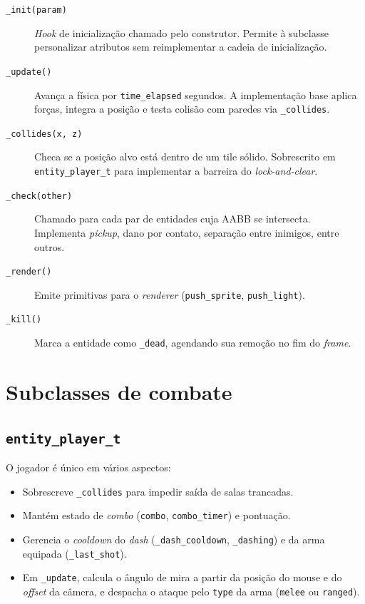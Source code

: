 \begin{description}
  \item[\texttt{\_init(param)}] \emph{Hook} de inicialização chamado pelo construtor.
    Permite à subclasse personalizar atributos sem reimplementar a cadeia de
    inicialização.
  \item[\texttt{\_update()}] Avança a física por \texttt{time\_elapsed} segundos. A
    implementação base aplica forças, integra a posição e testa colisão com paredes via
    \texttt{\_collides}.
  \item[\texttt{\_collides(x, z)}] Checa se a posição alvo está dentro de um tile
    sólido. Sobrescrito em \texttt{entity\_player\_t} para implementar a barreira do
    \emph{lock-and-clear}.
  \item[\texttt{\_check(other)}] Chamado para cada par de entidades cuja AABB se
    intersecta. Implementa \emph{pickup}, dano por contato, separação entre inimigos,
    entre outros.
  \item[\texttt{\_render()}] Emite primitivas para o \emph{renderer}
    (\texttt{push\_sprite}, \texttt{push\_light}).
  \item[\texttt{\_kill()}] Marca a entidade como \texttt{\_dead}, agendando sua remoção
    no fim do \emph{frame}.
\end{description}

\section{Subclasses de combate}

\subsection{\texttt{entity\_player\_t}}

O jogador é único em vários aspectos:

\begin{itemize}
  \item Sobrescreve \texttt{\_collides} para impedir saída de salas trancadas.
  \item Mantém estado de \emph{combo} (\texttt{combo}, \texttt{combo\_timer}) e
    pontuação.
  \item Gerencia o \emph{cooldown} do \emph{dash} (\texttt{\_dash\_cooldown},
    \texttt{\_dashing}) e da arma equipada (\texttt{\_last\_shot}).
  \item Em \texttt{\_update}, calcula o ângulo de mira a partir da posição do mouse e
    do \emph{offset} da câmera, e despacha o ataque pelo \texttt{type} da arma
    (\texttt{melee} ou \texttt{ranged}).
\end{itemize}

